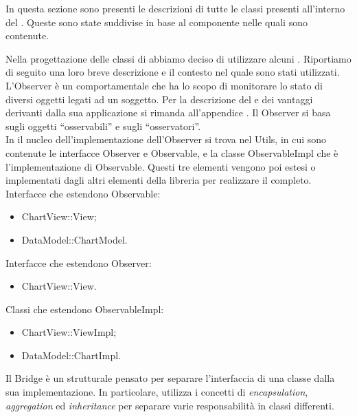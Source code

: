 		In questa sezione sono presenti le descrizioni di tutte le classi presenti all'interno del  . Queste sono state suddivise in base al componente nelle quali sono contenute.
		
		
	
		Nella progettazione delle classi di  abbiamo deciso di utilizzare alcuni . Riportiamo di seguito una loro breve descrizione e il contesto nel quale sono stati utilizzati.
			L'Observer è un  comportamentale che ha lo scopo di monitorare lo stato di diversi oggetti legati ad un soggetto.
			Per la descrizione del  e dei vantaggi derivanti dalla sua applicazione si rimanda all'appendice .
				Il  Observer si basa sugli oggetti “osservabili” e sugli “osservatori”. \\In {} il nucleo dell'implementazione dell'Observer si trova nel  Utils, in cui sono contenute le interfacce Observer e Observable, e la classe ObservableImpl che è l'implementazione di Observable. Questi tre elementi vengono poi estesi o implementati dagli altri elementi della libreria per realizzare il  completo.\\
				Interfacce che estendono Observable:
				\begin{itemize}
					\item ChartView::View;
					\item DataModel::ChartModel.
				\end{itemize}
				Interfacce che estendono Observer:
				\begin{itemize}
					\item ChartView::View.
				\end{itemize}
				Classi che estendono ObservableImpl:
				\begin{itemize}
					\item ChartView::ViewImpl;
					\item DataModel::ChartImpl.
				\end{itemize}
			Il Bridge è un  strutturale pensato per separare l'interfaccia di una classe dalla sua implementazione. In particolare, utilizza i concetti di \textit{encapsulation}, \textit{aggregation} ed \textit{inheritance} per separare varie responsabilità in classi differenti. \\
